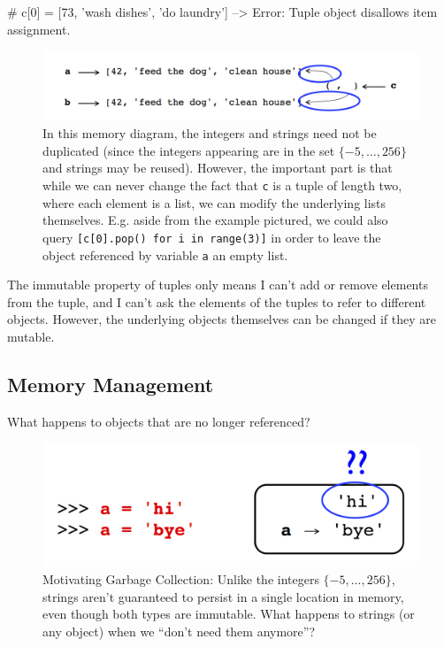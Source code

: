 \documentclass[12pt,letterpaper,twoside]{article}
\begin{document}
\begin{enumerate}
\begin{python}
# c[0] = [73, 'wash dishes', 'do laundry'] --> Error: Tuple object disallows item assignment.
\end{python}

\begin{figure}[h]
\centering
\includegraphics[scale=0.45]{fig/tuples-and-immutability.png}
\caption{In this memory diagram, the integers and strings need not be duplicated 
(since the integers appearing are in the set $\{-5, \ldots, 256\}$ and strings may
be reused). However, the important part is that while we can never change the fact that 
\texttt{c} is a tuple of length two, where each element is a list, we can modify the underlying
lists themselves. E.g. aside from the example pictured, we could also query 
\texttt{[c[0].pop() for i in range(3)]} in order to leave the object referenced by variable 
\texttt{a} an empty list.}
\end{figure}

The immutable property of tuples only means I can't add or remove elements from the tuple, and I can't
ask the elements of the tuples to refer to different objects. However, the underlying objects themselves
can be changed if they are mutable.

\subsection{Memory Management}
What happens to objects that are no longer referenced?

\begin{figure}[h]
\centering
\includegraphics[scale=0.35]{fig/gc-1.png}
\caption{Motivating Garbage Collection: Unlike the integers $\{-5, \ldots, 256\}$, strings aren't guaranteed
to persist in a single location in memory, even though both types are immutable. What happens to strings (or any object) when we
``don't need them anymore''?}
\end{figure}


\end{enumerate}
\end{document}
